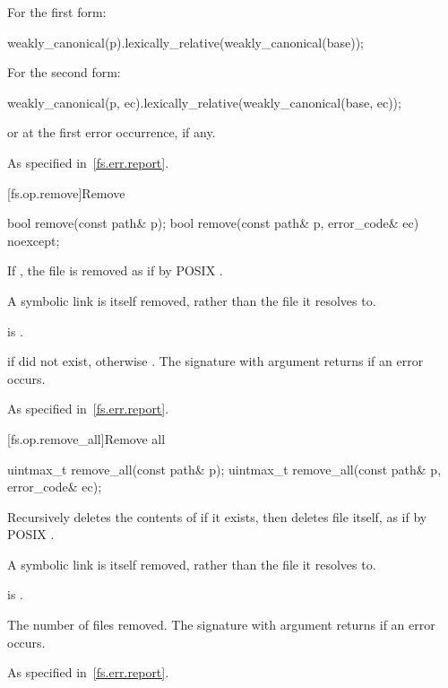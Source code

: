 \begin{itemdescr}
\pnum
\returns For the first form:
\begin{codeblock}
weakly_canonical(p).lexically_relative(weakly_canonical(base));
\end{codeblock}
  For the second form:
\begin{codeblock}
weakly_canonical(p, ec).lexically_relative(weakly_canonical(base, ec));
\end{codeblock}
  or  at the first error occurrence, if any.

\pnum
\throws As specified in~\ref{fs.err.report}.
\end{itemdescr}

[fs.op.remove]{Remove}

%
\begin{itemdecl}
bool remove(const path& p);
bool remove(const path& p, error_code& ec) noexcept;
\end{itemdecl}

\begin{itemdescr}
\pnum
\effects If , the file  is
  removed as if by POSIX .
\begin{note} A symbolic link is itself removed, rather than the file it
  resolves to. \end{note}

\pnum
\ensures {} is .

\pnum
\returns {} if  did not exist,
  otherwise . The signature with argument 
  returns  if an error occurs.

\pnum
\throws As specified in~\ref{fs.err.report}.
\end{itemdescr}


[fs.op.remove_all]{Remove all}

%
\begin{itemdecl}
uintmax_t remove_all(const path& p);
uintmax_t remove_all(const path& p, error_code& ec);
\end{itemdecl}

\begin{itemdescr}
\pnum
\effects Recursively deletes the contents of  if it exists,
  then deletes file  itself, as if by POSIX .
\begin{note} A symbolic link is itself removed, rather than the file it
  resolves to. \end{note}

\pnum
\ensures {} is .

\pnum
\returns The number of files removed. The signature with argument
   returns  if an error
  occurs.

\pnum
\throws As specified in~\ref{fs.err.report}.
\end{itemdescr}


